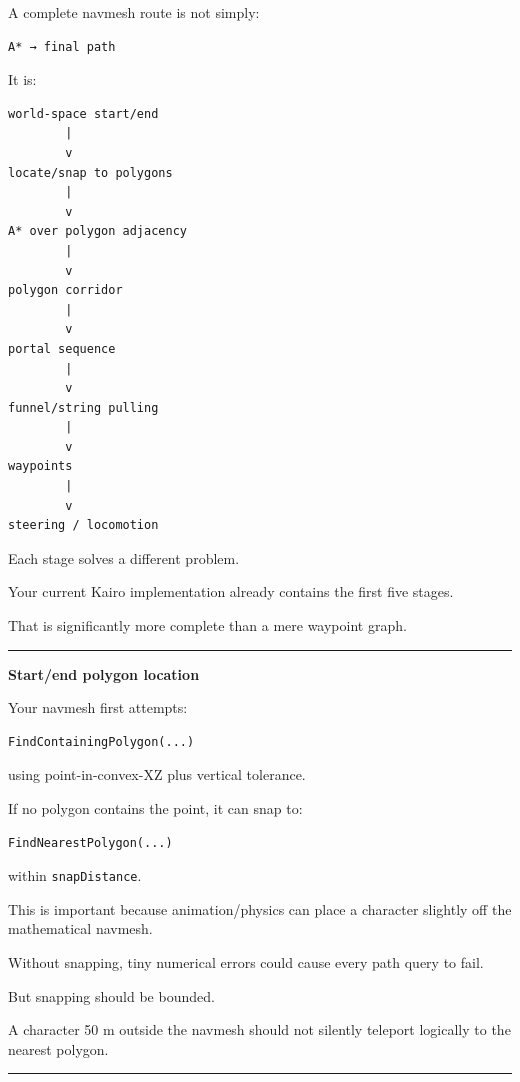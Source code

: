 A complete navmesh route is not simply:

\begin{verbatim}
A* → final path
\end{verbatim}

It is:

\begin{verbatim}
world-space start/end
        |
        v
locate/snap to polygons
        |
        v
A* over polygon adjacency
        |
        v
polygon corridor
        |
        v
portal sequence
        |
        v
funnel/string pulling
        |
        v
waypoints
        |
        v
steering / locomotion
\end{verbatim}

Each stage solves a different problem.

Your current Kairo implementation already contains the first five stages.

That is significantly more complete than a mere waypoint graph.

\begin{center}\rule{0.5\linewidth}{0.5pt}\end{center}

\textbf{Start/end polygon location}

Your navmesh first attempts:

\begin{verbatim}
FindContainingPolygon(...)
\end{verbatim}

using point-in-convex-XZ plus vertical tolerance.

If no polygon contains the point, it can snap to:

\begin{verbatim}
FindNearestPolygon(...)
\end{verbatim}

within \texttt{snapDistance}.

This is important because animation/physics can place a character slightly off the mathematical navmesh.

Without snapping, tiny numerical errors could cause every path query to fail.

But snapping should be bounded.

A character 50 m outside the navmesh should not silently teleport logically to the nearest polygon.

\begin{center}\rule{0.5\linewidth}{0.5pt}\end{center}

